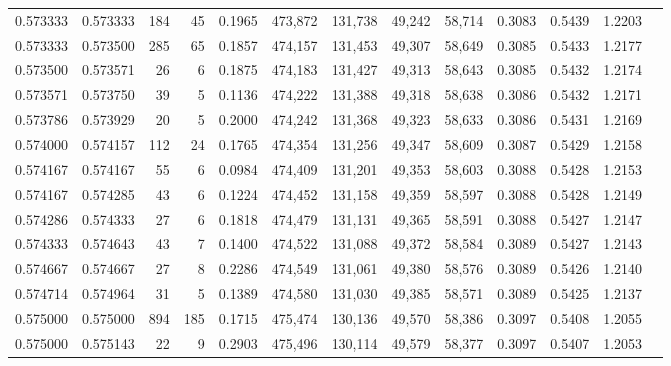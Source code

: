 \begin{tabular}{rrrrrrrrrrrrr}
0.573333 & 0.573333 &   184 &  45 &                                     0.1965 & 473,872 & 131,738 &  49,242 &  58,714 & 0.3083 & 0.5439 & 1.2203 \\
0.573333 & 0.573500 &   285 &  65 &                                     0.1857 & 474,157 & 131,453 &  49,307 &  58,649 & 0.3085 & 0.5433 & 1.2177 \\
0.573500 & 0.573571 &    26 &   6 &                                     0.1875 & 474,183 & 131,427 &  49,313 &  58,643 & 0.3085 & 0.5432 & 1.2174 \\
0.573571 & 0.573750 &    39 &   5 &                                     0.1136 & 474,222 & 131,388 &  49,318 &  58,638 & 0.3086 & 0.5432 & 1.2171 \\
0.573786 & 0.573929 &    20 &   5 &                                     0.2000 & 474,242 & 131,368 &  49,323 &  58,633 & 0.3086 & 0.5431 & 1.2169 \\
0.574000 & 0.574157 &   112 &  24 &                                     0.1765 & 474,354 & 131,256 &  49,347 &  58,609 & 0.3087 & 0.5429 & 1.2158 \\
0.574167 & 0.574167 &    55 &   6 &                                     0.0984 & 474,409 & 131,201 &  49,353 &  58,603 & 0.3088 & 0.5428 & 1.2153 \\
0.574167 & 0.574285 &    43 &   6 &                                     0.1224 & 474,452 & 131,158 &  49,359 &  58,597 & 0.3088 & 0.5428 & 1.2149 \\
0.574286 & 0.574333 &    27 &   6 &                                     0.1818 & 474,479 & 131,131 &  49,365 &  58,591 & 0.3088 & 0.5427 & 1.2147 \\
0.574333 & 0.574643 &    43 &   7 &                                     0.1400 & 474,522 & 131,088 &  49,372 &  58,584 & 0.3089 & 0.5427 & 1.2143 \\
0.574667 & 0.574667 &    27 &   8 &                                     0.2286 & 474,549 & 131,061 &  49,380 &  58,576 & 0.3089 & 0.5426 & 1.2140 \\
0.574714 & 0.574964 &    31 &   5 &                                     0.1389 & 474,580 & 131,030 &  49,385 &  58,571 & 0.3089 & 0.5425 & 1.2137 \\
0.575000 & 0.575000 &   894 & 185 &                                     0.1715 & 475,474 & 130,136 &  49,570 &  58,386 & 0.3097 & 0.5408 & 1.2055 \\
0.575000 & 0.575143 &    22 &   9 &                                     0.2903 & 475,496 & 130,114 &  49,579 &  58,377 & 0.3097 & 0.5407 & 1.2053 \\

\end{tabular}

